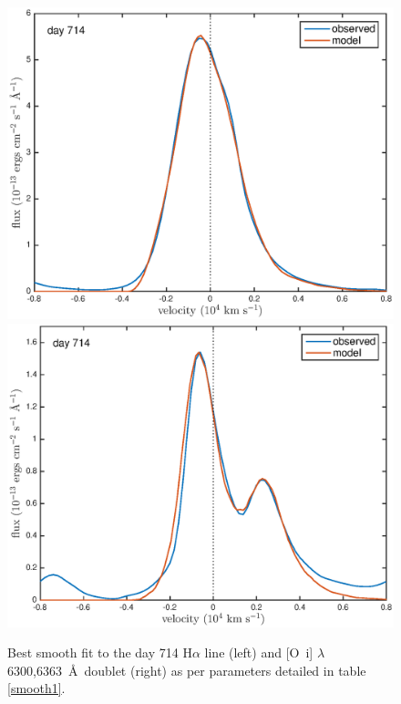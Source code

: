 \documentclass[useAMS,usenatbib,usegraphicx]{mnras}
\begin{document}
\begin{figure}
\begin{center}
\includegraphics[trim =37 10 45 15,clip=true,scale=0.51]{smooth/best_fit/d714Ha}
\includegraphics[trim =37 10 45 15,clip=true,scale=0.51]{smooth/best_fit/d714OI}
\caption{Best smooth fit to the day 714 H$\alpha$ line (left) and 
[O~{\sc i}] $\lambda$6300,6363~\AA\ doublet (right) as per parameters 
detailed in table \ref{smooth1}.}
\label{d714bf}
\end{center}
\end{figure}
\end{document}
